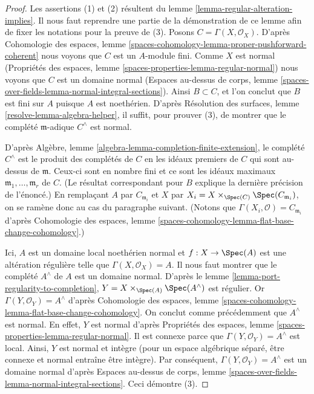 \begin{proof}
Les assertions (1) et (2) résultent du lemme
\ref{lemma-regular-alteration-implies}.
Il nous faut reprendre une partie de la démonstration de ce lemme afin de
fixer les notations pour la preuve de (3). Posons
$C = \Gamma(X, \mathcal{O}_X)$. D'après Cohomologie des espaces, lemme
\ref{spaces-cohomology-lemma-proper-pushforward-coherent}
nous voyons que $C$ est un $A$-module fini.
Comme $X$ est normal (Propriétés des espaces, lemme
\ref{spaces-properties-lemma-regular-normal})
nous voyons que $C$ est un domaine normal (Espaces au-dessus de corps, lemme
\ref{spaces-over-fields-lemma-normal-integral-sections}).
Ainsi $B \subset C$, et l'on conclut que $B$ est fini sur $A$ puisque $A$ est
noethérien. D'après Résolution des surfaces, lemme
\ref{resolve-lemma-algebra-helper}, il suffit, pour prouver (3), de montrer que
le complété $\mathfrak m$-adique $C^\wedge$ est normal.

\medskip\noindent
D'après Algèbre, lemme \ref{algebra-lemma-completion-finite-extension},
le complété $C^\wedge$ est le produit des complétés de $C$ en les idéaux
premiers de $C$ qui sont au-dessus de $\mathfrak m$. Ceux-ci sont en nombre
fini et ce sont
les idéaux maximaux $\mathfrak m_1, \ldots, \mathfrak m_r$ de $C$.
(Le résultat correspondant pour $B$ explique la dernière précision de
l'énoncé.) En remplaçant $A$ par $C_{\mathfrak m_i}$ et $X$ par
$X_i = X \times_{\Spec(C)} \Spec(C_{\mathfrak m_i})$, on se ramène donc au
cas du paragraphe suivant. (Notons que
$\Gamma(X_i, \mathcal{O}) = C_{\mathfrak m_i}$ d'après Cohomologie des espaces,
lemme \ref{spaces-cohomology-lemma-flat-base-change-cohomology}.)

\medskip\noindent
Ici, $A$ est un domaine local noethérien normal et $f : X \to \Spec(A)$ est
une altération régulière telle que $\Gamma(X, \mathcal{O}_X) = A$.
Il nous faut montrer que le complété $A^\wedge$ de $A$ est un domaine normal.
D'après le lemme \ref{lemma-port-regularity-to-completion},
$Y = X \times_{\Spec(A)} \Spec(A^\wedge)$ est régulier.
Or $\Gamma(Y, \mathcal{O}_Y) = A^\wedge$ d'après Cohomologie des espaces,
lemme \ref{spaces-cohomology-lemma-flat-base-change-cohomology}.
On conclut comme précédemment que $A^\wedge$ est normal.
En effet, $Y$ est normal d'après Propriétés des espaces, lemme
\ref{spaces-properties-lemma-regular-normal}.
Il est connexe parce que $\Gamma(Y, \mathcal{O}_Y) = A^\wedge$ est local.
Ainsi, $Y$ est normal et intègre (pour un espace algébrique séparé, être
connexe et normal entraîne être intègre). Par conséquent,
$\Gamma(Y, \mathcal{O}_Y) = A^\wedge$ est un domaine normal d'après
Espaces au-dessus de corps, lemme
\ref{spaces-over-fields-lemma-normal-integral-sections}.
Ceci démontre (3).


\end{proof}

